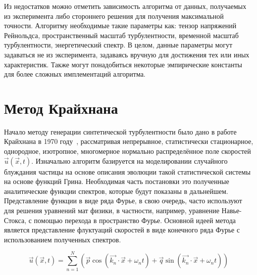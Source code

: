 Из недостатков можно отметить зависимость алгоритма от данных, получаемых из эксперимента либо стороннего решения для получения максимальной точности. Алгоритму необходимые такие параметры как: тензор напряжений Рейнольдса, пространственный масштаб турбулентности, временной масштаб турбулентности, энергетический спектр. В целом, данные параметры могут задаваться не из эксперимента, задаваясь вручную для достижения тех или иных характеристик. Также могут понадобиться некоторые эмпирические константы для более сложных имплементаций алгоритма. 

\section{Метод Крайхнана} \label{sect2_1}

Начало методу генерации синтетической турбулентности было дано в работе Крайхнана в 1970 году~\cite{Kraichnan70}, рассматривая непрерывное, статистически стационарное, однородное, изотропное, многомерное нормально распределённое поле скоростей $\Vec{u}(\vec{x}, t)$. Изначально алгоритм базируется на моделировании случайного блуждания частицы на основе описания эволюции такой статистической системы на основе функций Грина. Необходимая часть постановки это полученные аналитические функции спектров, которые будут показаны в дальнейшем. Представление функции в виде ряда Фурье, в свою очередь, часто используют для решения уравнений мат физики, в частности, например, уравнение Навье-Стокса, с помощью перехода в пространство Фурье. Основной идеей метода является представление флуктуаций скоростей в виде конечного ряда Фурье с использованием полученных спектров. 

\begin{equation}
  \label{eq:spectral_equation1}
  \vec{u} (\vec{x}, t) = \sum_{n=1}^{N} \left( \vec{p} \cos{(\vec{k_n} \cdot \vec{x} + \omega_n t)} + \vec{q} \sin{(\vec{k_n} \cdot \vec{x} + \omega_n t)} \right)
\end{equation}

